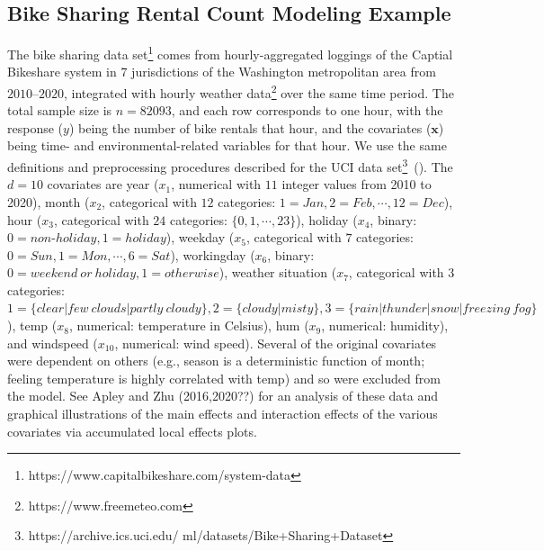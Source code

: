 \documentclass[twoside,11pt]{article}
\begin{document}
\subsection{Bike Sharing Rental Count Modeling Example}
\label{ss:bs_ds}

The bike sharing data set\footnote{https://www.capitalbikeshare.com/system-data} comes from hourly-aggregated loggings of the Captial Bikeshare system in $7$ jurisdictions of the Washington metropolitan area from $2010$--$2020$, integrated with hourly weather data\footnote{https://www.freemeteo.com} over the same time period. The total sample size is $n=82093$, and each row corresponds to one hour, with the response ($y$) being the number of bike rentals that hour, and the covariates ($\bm {x}$) being time- and environmental-related variables for that hour. We use the same definitions and preprocessing procedures described for the UCI data set\footnote{https://archive.ics.uci.edu/
ml/datasets/Bike+Sharing+Dataset}~(\cite{fanaee2014event}). The $d=10$ covariates are year ($x_1$, numerical with $11$ integer values from 2010 to 2020), month ($x_2$, categorical with $12$ categories: $1=Jan, 2=Feb, \cdots, 12=Dec$), hour ($x_3$, categorical with $24$ categories: $\{0,1,\cdots,23\}$), holiday ($x_4$, binary: $0=non\text{-}holiday,1=holiday$), weekday ($x_5$, categorical with $7$ categories: 
$0=Sun,1=Mon,\cdots,6=Sat$), workingday ($x_6$, binary: $0=weekend~or~holiday,1=otherwise$), weather situation ($x_7$, categorical with $3$ categories: $1 = \{clear|few~clouds|partly~cloudy\}, 2=\{cloudy|misty\}, 3=\{rain|thunder|snow|freezing~fog\}$), temp ($x_8$, numerical: temperature in Celsius), hum ($x_{9}$, numerical: humidity), and windspeed ($x_{10}$, numerical: wind speed). Several of the original covariates were dependent on others (e.g., season is a deterministic function of month; feeling temperature is highly correlated with temp) and so were excluded from the model. See Apley and Zhu (2016,2020??) for an analysis of these data and graphical illustrations of the main effects and interaction effects of the various covariates via accumulated local effects plots.  %
\end{document}

